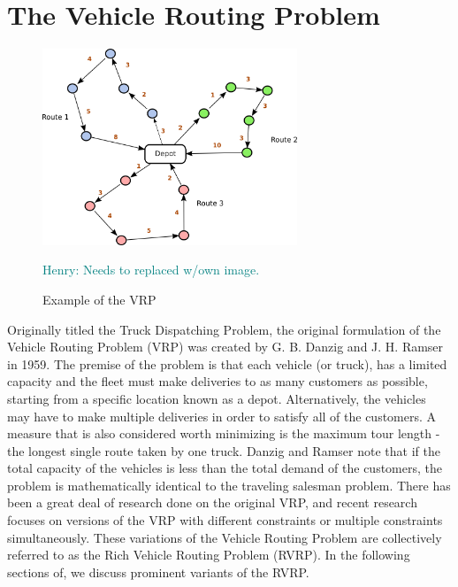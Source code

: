 \documentclass{sig-alternate}
\newcommand{\allcomments}[1]{{#1}}
\newcommand{\hfcomment}[1]{\textcolor{Teal}{\allcomments{Henry: {#1}}}}
\begin{document}
{\section{The Vehicle Routing Problem}
\label{sec:VRP}

\begin{figure}
\centering
\includegraphics[width=3in, keepaspectratio]{vrp1.png}
\caption{Example of the VRP}
\hfcomment{Needs to replaced w/own image.}
\label{fig:VRPgraph}
\end{figure}

Originally titled the Truck Dispatching Problem, the original formulation of the Vehicle Routing Problem (VRP) was created by G. B. Danzig and J. H. Ramser in 1959\cite{Danzig:1959}. The premise of the problem is that each vehicle (or truck), has a limited capacity and the fleet must make deliveries to as many customers as possible, starting from a specific location known as a depot\cite{Caceres-Cruz:2014}. Alternatively, the vehicles may have to make multiple deliveries in order to satisfy all of the customers. A measure that is also considered worth minimizing is the maximum tour length - the longest single route taken by one truck. Danzig and Ramser note that if the total capacity of the vehicles is less than the total demand of the customers, the problem is mathematically identical to the traveling salesman problem. There has been a great deal of research done on the original VRP, and recent research focuses on versions of the VRP with different constraints or multiple constraints simultaneously. These variations of the Vehicle Routing Problem are collectively referred to as the Rich Vehicle Routing Problem\cite{Caceres-Cruz:2014} (RVRP). In the following sections of, we discuss prominent variants of the RVRP.
}
\end{document}
